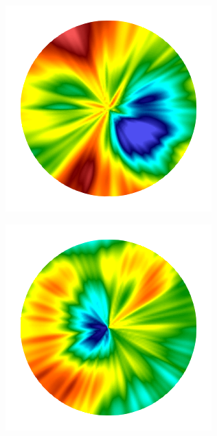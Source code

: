 \begin{figure}[htb!]
\begin{subfigure}{0.14\textwidth}
    \caption{}
  \end{subfigure}
  \hspace{0.02\textwidth}
  \begin{subfigure}{0.15\textwidth}
    \includegraphics[width=\textwidth]{Chapter4/figures/2D/Gc_radial.png}
    \caption{}
  \end{subfigure}
  \begin{subfigure}{0.15\textwidth}
    \includegraphics[width=\textwidth]{Chapter4/figures/2D/psic_radial.png}

\end{subfigure}
\end{figure}
